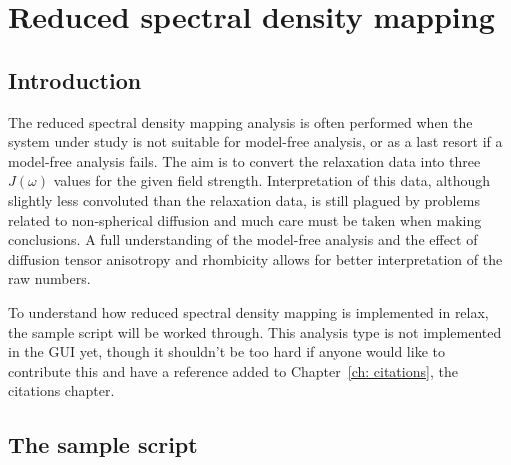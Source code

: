 
\chapter{Reduced spectral density mapping} \label{ch: J(w) mapping}


\section{Introduction}

The reduced spectral density mapping analysis is often performed when the system under study is not suitable for model-free analysis, or as a last resort if a model-free analysis fails.  The aim is to convert the relaxation data into three $J(\omega)$ values for the given field strength.  Interpretation of this data, although slightly less convoluted than the relaxation data, is still plagued by problems related to non-spherical diffusion and much care must be taken when making conclusions.  A full understanding of the model-free analysis and the effect of diffusion tensor anisotropy and rhombicity allows for better interpretation of the raw numbers.

To understand how reduced spectral density mapping is implemented in relax, the sample script will be worked through.  This analysis type is not implemented in the GUI yet, though it shouldn't be too hard if anyone would like to contribute this and have a reference added to Chapter~\ref{ch: citations}, the citations chapter.



\section{The sample script}

